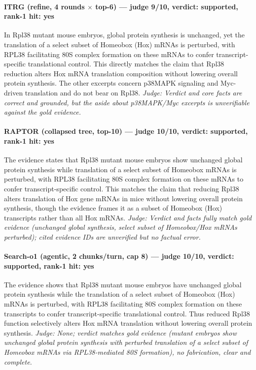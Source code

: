 \documentclass[sigconf, review, anonymous]{acmart}
\begin{document}
\paragraph{ITRG (refine, 4 rounds $\times$ top-6) --- judge 9/10, verdict: supported, rank-1 hit: yes}
\noindent In Rpl38 mutant mouse embryos, global protein synthesis is unchanged, yet the translation of a select subset of Homeobox (Hox) mRNAs is perturbed, with RPL38 facilitating 80S complex formation on these mRNAs to confer transcript-specific translational control. This directly matches the claim that Rpl38 reduction alters Hox mRNA translation composition without lowering overall protein synthesis. The other excerpts concern p38MAPK signaling and Myc-driven translation and do not bear on Rpl38.
\noindent\small\textit{Judge: Verdict and core facts are correct and grounded, but the aside about p38MAPK/Myc excerpts is unverifiable against the gold evidence.}
\paragraph{RAPTOR (collapsed tree, top-10) --- judge 10/10, verdict: supported, rank-1 hit: yes}
\noindent The evidence states that Rpl38 mutant mouse embryos show unchanged global protein synthesis while translation of a select subset of Homeobox mRNAs is perturbed, with RPL38 facilitating 80S complex formation on these mRNAs to confer transcript-specific control. This matches the claim that reducing Rpl38 alters translation of Hox gene mRNAs in mice without lowering overall protein synthesis, though the evidence frames it as a subset of Homeobox (Hox) transcripts rather than all Hox mRNAs.
\noindent\small\textit{Judge: Verdict and facts fully match gold evidence (unchanged global synthesis, select subset of Homeobox/Hox mRNAs perturbed); cited evidence IDs are unverified but no factual error.}
\paragraph{Search-o1 (agentic, 2 chunks/turn, cap 8) --- judge 10/10, verdict: supported, rank-1 hit: yes}
\noindent The evidence shows that Rpl38 mutant mouse embryos have unchanged global protein synthesis while the translation of a select subset of Homeobox (Hox) mRNAs is perturbed, with RPL38 facilitating 80S complex formation on these transcripts to confer transcript-specific translational control. Thus reduced Rpl38 function selectively alters Hox mRNA translation without lowering overall protein synthesis.
\noindent\small\textit{Judge: None; verdict matches gold evidence (mutant embryos show unchanged global protein synthesis with perturbed translation of a select subset of Homeobox mRNAs via RPL38-mediated 80S formation), no fabrication, clear and complete.}
\end{document}

